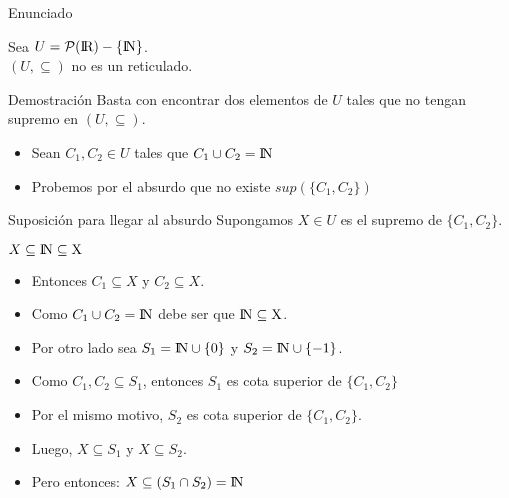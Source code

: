 \documentclass[10pt]{beamer}
\newcommand{\powerset}{\mathcal{P}}
\newcommand{\R}{\rm I\!R}
\newcommand{\N}{\rm I\!N}
\newcommand{\universe}{\powerset(\R) - \{\N\}}
\newcommand{\poset}{(U, \subseteq)}
\begin{document}
\begin{frame}{Enunciado}
  \begin{center}
    Sea $U = \universe$. \\
    $\poset$ no es un reticulado.
  \end{center}
\end{frame}

\begin{frame}{Demostración}
  Basta con encontrar dos elementos de $U$ tales que no tengan supremo en $\poset$.
  \begin{itemize}[<+->]

    \item Sean $C_1 , C_2 \in U$ tales que $C_1 \cup C_2 = \N$

    \item Probemos por el absurdo que no existe $sup(\{C_1, C_2\})$
  \end{itemize}
\end{frame}

\begin{frame}{Suposición para llegar al absurdo}
    Supongamos $X \in U$ es el supremo de $\{C_1, C_2\}$.
\end{frame}

\begin{frame}{$X \subseteq \N \subseteq X$}
  \begin{itemize}[<+->]

    \item Entonces $C_1 \subseteq X$ y $C_2 \subseteq X$.
    \item Como $C_1 \cup C_2 = \N$ debe ser que \alert{$\N \subseteq X$}.

    \item Por otro lado sea $S_1 = \N \cup \{0\}$ y $S_2 = \N \cup \{-1\}$.
    \item Como $C_1, C_2 \subseteq S_1$, entonces $S_1$ es cota superior de  $\{C_1, C_2\}$
    \item Por el mismo motivo, $S_2$ es cota superior de  $\{C_1, C_2\}$.

    \item Luego, $X \subseteq S_1$ y $X \subseteq S_2$.

    \item Pero entonces: \alert{$X \subseteq (S_1 \cap S_2) = \N$}

  \end{itemize}
\end{frame}
\end{document}
